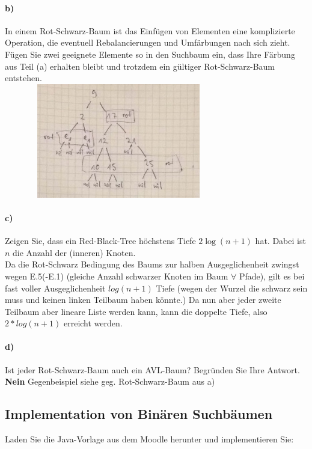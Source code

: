 \documentclass[paper=a4, fontsize=11pt]{scrartcl}
\numberwithin{equation}{section}
\numberwithin{figure}{section}
\numberwithin{table}{section}
\begin{document}
\paragraph{b)} 
In einem Rot-Schwarz-Baum ist das Einfügen von Elementen eine komplizierte Operation,
die eventuell Rebalancierungen und Umfärbungen nach sich zieht.
Fügen Sie zwei geeignete Elemente so in den Suchbaum ein, dass Ihre Färbung aus Teil (a)
erhalten bleibt und trotzdem ein gültiger Rot-Schwarz-Baum entstehen. \\

\includegraphics[width=10cm,height=5cm]{baum06A3b.jpg} \\

\paragraph{c)}
Zeigen Sie, dass ein Red-Black-Tree höchstens Tiefe $2\log(n+1)$ hat. Dabei ist
$n$ die Anzahl der (inneren) Knoten. \\

Da die Rot-Schwarz Bedingung des Baums zur halben Ausgeglichenheit zwingst wegen E.5(-E.1) (gleiche Anzahl schwarzer Knoten im Baum $\forall$ Pfade), gilt es bei fast voller Ausgeglichenheit $log(n+1)$ Tiefe (wegen der Wurzel die schwarz sein muss und keinen linken Teilbaum haben könnte.) Da nun aber jeder zweite Teilbaum aber lineare Liste werden kann, kann die doppelte Tiefe, also $2*log(n+1)$ erreicht werden.

\paragraph{d)} 
Ist jeder Rot-Schwarz-Baum auch ein AVL-Baum? Begründen Sie Ihre Antwort. \\

\textbf{Nein}
Gegenbeispiel siehe geg. Rot-Schwarz-Baum aus a)

\subsection{Implementation von Binären Suchbäumen}
Laden Sie die Java-Vorlage aus dem Moodle herunter und implementieren Sie:
\end{document}
